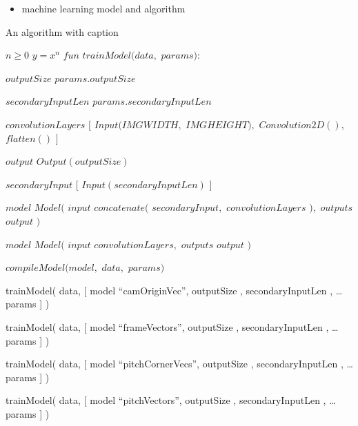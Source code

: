 \documentclass[
11pt,
twoside
]{report}
\begin{document}
\begin{itemize}
\item
  machine learning model and algorithm
\end{itemize}


\begin{algorithm}
\begin{algorithmic}


\caption{An algorithm with caption}\label{alg:cap}

\Require $n \geq 0$
\Ensure $y = x^n$
\State $fun$ $trainModel(data,$ $params):$

\State $outputSize$ \gets $params.outputSize$


\State $secondaryInputLen$ \gets $params.secondaryInputLen$


\State $convolutionLayers$ \gets $[$
    \State $Input(IMGWIDTH,$ $IMGHEIGHT),$
    \State $Convolution2D(),$
    $flatten()$
\State $]$


\State $output$ \gets $Output(outputSize)$



    \State $secondaryInput$ \gets $[$
        \State $Input(secondaryInputLen)$
    \State $]$

    \State $model$ \gets $Model($
        \State $input$ \gets $concatenate($
            \State $secondaryInput,$
            \State $convolutionLayers$
        \State $),$
        \State $outputs$ \gets $output$
    \State $)$

\Else

    \State $model$ \gets $Model($
        \State $input$ \gets $convolutionLayers,$
        \State $outputs$ \gets $output$
    \State $)$


\State $compileModel(model,$ $data,$ $params)$

\State trainModel( data, {[} model \gets ``camOriginVec'', outputSize , secondaryInputLen , \ldots params {]} )

\State trainModel( data, {[} model \gets ``frameVectors'', outputSize ,
secondaryInputLen , \ldots params {]} )

\State trainModel( data, {[} model \gets ``pitchCornerVecs'', outputSize
, secondaryInputLen , \ldots params {]} )

\State trainModel( data, {[} model \gets ``pitchVectors'', outputSize ,
secondaryInputLen , \ldots params {]} )

\end{algorithmic}
\end{algorithm}
\end{document}
